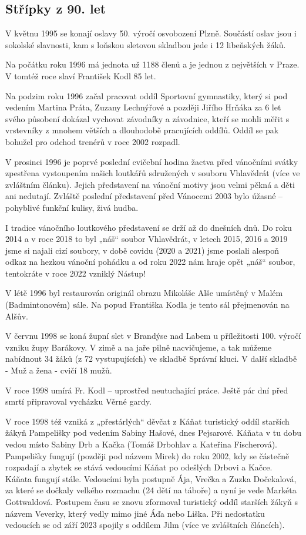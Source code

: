 \subsection{Střípky z 90. let}\label{stux159uxedpky-z-90.-let}

V květnu 1995 se konají oslavy 50. výročí osvobození Plzně. Součástí
oslav jsou i sokolské slavnosti, kam s loňskou sletovou skladbou jede i
12 libeňských žáků.

Na počátku roku 1996 má jednota už 1188 členů a je jednou z největších v
Praze. V tomtéž roce slaví František Kodl 85 let.

Na podzim roku 1996 začal pracovat oddíl Sportovní gymnastiky, který si
pod vedením Martina Práta, Zuzany Lechnýřové a později Jiřího Hrňáka za
6 let svého působení dokázal vychovat závodníky a závodnice, kteří se
mohli měřit s vrstevníky z mnohem větších a dlouhodobě pracujících
oddílů. Oddíl se pak bohužel pro odchod trenérů v roce 2002 rozpadl.

V prosinci 1996 je poprvé poslední cvičební hodina žactva před vánočními
svátky zpestřena vystoupením našich loutkářů sdružených v souboru
Vhlavědrát (více ve zvláštním článku). Jejich představení na vánoční
motivy jsou velmi pěkná a děti ani nedutají. Zvláště poslední
představení před Vánocemi 2003 bylo úžasné -- pohyblivé funkční kulisy,
živá hudba.

I tradice vánočního loutkového představení se drží až do dnešních dnů.
Do roku 2014 a v roce 2018 to byl „náš`` soubor Vhlavědrát, v letech
2015, 2016 a 2019 jsme si najali cizí soubory, v době covidu (2020 a
2021) jsme poslali alespoň odkaz na hezkou vánoční pohádku a od roku
2022 nám hraje opět „náš`` soubor, tentokráte v roce 2022 vzniklý
Nástup!

V létě 1996 byl restaurován originál obrazu Mikoláše Alše umístěný v
Malém (Badmintonovém) sále. Na popud Františka Kodla je tento sál
přejmenován na Alšův.

V červnu 1998 se koná župní slet v Brandýse nad Labem u příležitosti
100. výročí vzniku župy Barákovy. V zimě a na jaře pilně nacvičujeme, a
tak můžeme nabídnout 34 žáků (z 72 vystupujících) ve skladbě Správní
kluci. V další skladbě - Muž a žena - cvičí 18 mužů.

V roce 1998 umírá Fr. Kodl -- uprostřed neutuchající práce. Ještě pár
dní před smrtí připravoval vycházku Věrné gardy.

V roce 1998 též vzniká z „přestárlých`` děvčat z Káňat turistický oddíl
starších žákyň Pampelišky pod vedením Sabiny Hašové, dnes Pejsarové.
Káňata v tu dobu vedou místo Sabiny Drb a Kačka (Tomáš Drbohlav a
Kateřina Fischerová). Pampelišky fungují (později pod názvem Mirek) do
roku 2002, kdy se částečně rozpadají a zbytek se stává vedoucími Káňat
po odešlých Drbovi a Kačce. Káňata fungují stále. Vedoucími byla
postupně Ája, Vrečka a Zuzka Dočekalová, za které se dočkaly velkého
rozmachu (24 dětí na táboře) a nyní je vede Markéta Gottwaldová.
Postupem času se znovu zformoval turistický oddíl starších žákyň s
názvem Veverky, který vedly mimo jiné Áďa nebo Liška. Při nedostatku
vedoucích se od září 2023 spojily s oddílem Jilm (více ve zvláštních
článcích).

